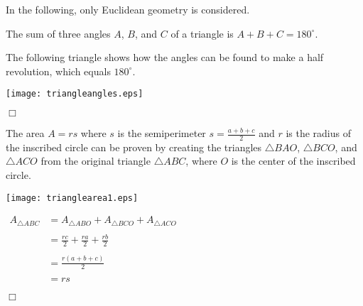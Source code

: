 \documentclass[12pt]{article}
\begin{document}
In the following, only Euclidean geometry is considered.

The sum of three angles $A$, $B$, and $C$ of a triangle is $A+B+C=180^\circ$.

The following triangle shows how the angles can be found to make a half revolution, which equals $180^\circ$.

\begin{center}
\texttt{[image: triangleangles.eps]}
\end{center}

$\Box$

The area  $A=rs$ where $s$ is the semiperimeter $\displaystyle s=\frac{a+b+c}{2}$ and $r$ is the radius of the inscribed circle can be proven by creating the triangles $\triangle BAO$, $\triangle BCO$, and $\triangle ACO$ from the original triangle $\triangle ABC$, where $O$ is the center of the inscribed circle.

\begin{center}
\texttt{[image: trianglearea1.eps]}
\end{center}

\vspace{5mm}

\begin{center}
$\begin{array}{rl}
A_{\triangle ABC} & =A_{\triangle ABO}+A_{\triangle BCO}+A_{\triangle ACO} \\
& \\
& \displaystyle =\frac{rc}{2}+\frac{ra}{2}+\frac{rb}{2} \\
& \\
& \displaystyle =\frac{r(a+b+c)}{2} \\
& \\
& =rs \end{array}$
\end{center}

$\Box$
\end{document}
